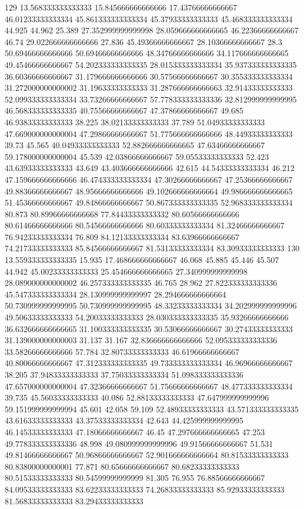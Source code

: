 129 13.568333333333333 15.845666666666666 17.43766666666667 46.01233333333334 45.861333333333334 45.37933333333333 45.468333333333334 44.925 44.962 25.389 27.352999999999998 28.059666666666665 46.22366666666667 46.74 29.022666666666666 27.836 45.49366666666667 28.10366666666667 28.3 50.69466666666666 50.69466666666666 48.34766666666666 34.117666666666665 49.45466666666667 54.202333333333335 28.015333333333334 35.937333333333335 36.60366666666667 31.179666666666666 30.57566666666667 30.355333333333334 31.272000000000002 31.19633333333333 31.287666666666663 32.91433333333333 52.099333333333334 33.73266666666667 57.778333333333336 32.812999999999995 46.568333333333335 40.75566666666667 47.37866666666667 49.685 46.93833333333333 38.225 38.02133333333333 37.789 51.04933333333333 47.669000000000004 47.29866666666667 51.775666666666666 48.44933333333333 39.73 45.565 40.04933333333333 52.882666666666665 47.63466666666667 59.178000000000004 45.539 42.03866666666667 59.05533333333333 52.423 43.63933333333333 43.649 43.403666666666666 42.615 44.54333333333334 46.212 47.159666666666666 46.474333333333334 47.30266666666667 47.25366666666667 49.88366666666667 48.95666666666666 49.102666666666664 49.986666666666665 51.45366666666667 49.84866666666667 50.867333333333335 52.968333333333334 80.873 80.89966666666668 77.84433333333332 80.60566666666666 80.61466666666666 80.54566666666666 80.60333333333334 81.32466666666667 76.94233333333334 76.809 84.12133333333334 83.63966666666667 74.21733333333333 85.84566666666667 81.53133333333334 83.30933333333333
130 13.559333333333335 15.935 17.468666666666667 46.068 45.885 45.446 45.507 44.942 45.00233333333333 25.454666666666665 27.340999999999998 28.089000000000002 46.257333333333335 46.765 28.962 27.822333333333336 45.547333333333334 28.130999999999997 28.294666666666664 50.730999999999995 50.730999999999995 48.33233333333334 34.202999999999996 49.50633333333333 54.20033333333333 28.030333333333335 35.93266666666666 36.632666666666665 31.100333333333335 30.53066666666667 30.27433333333333 31.139000000000003 31.137 31.167 32.836666666666666 52.095333333333336 33.58266666666666 57.784 32.80733333333333 46.61966666666667 40.80066666666667 47.312333333333335 49.733333333333334 46.96966666666667 38.205 37.94833333333333 37.75033333333334 51.098333333333336 47.657000000000004 47.32366666666667 51.75666666666667 48.477333333333334 39.735 45.56033333333333 40.086 52.88133333333333 47.647999999999996 59.151999999999994 45.601 42.058 59.109 52.48933333333333 43.571333333333335 43.61633333333333 43.37533333333334 42.643 44.425999999999995 46.14533333333333 47.18066666666667 46.45 47.297666666666665 47.253 49.778333333333336 48.998 49.080999999999996 49.91566666666667 51.531 49.81466666666667 50.96866666666667 52.901666666666664 80.81533333333333 80.83800000000001 77.871 80.65666666666667 80.68233333333333 80.51533333333333 80.54599999999999 81.305 76.955 76.88566666666667 84.09533333333333 83.62233333333333 74.26833333333333 85.92933333333333 81.56833333333333 83.29433333333333
